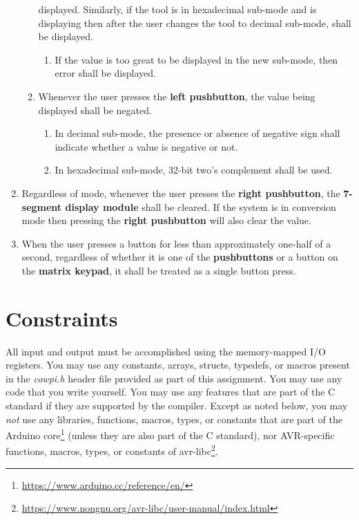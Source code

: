 \begin{enumerate}
\begin{enumerate}
        displayed. Similarly, if the tool is in hexadecimal sub-mode and is
        displaying {} then after the user changes the tool to
        decimal sub-mode, {} shall be displayed.
        \begin{enumerate}
        \item If the value is too great to be displayed in the new sub-mode,
            then {\dviiseg error} shall be displayed.
        \end{enumerate}
    \item Whenever the user presses the \textbf{left pushbutton}, the value
        being displayed shall be negated.
        \begin{enumerate}
        \item In decimal sub-mode, the presence or absence of negative sign
            shall indicate whether a value is negative or not.
        \item In hexadecimal sub-mode, 32-bit two's complement shall be used.
        \end{enumerate}
    \end{enumerate}
    \item Regardless of mode, whenever the user presses the \textbf{right
        pushbutton}, the \textbf{7-segment display module} shall be cleared. If
        the system is in conversion mode then pressing the \textbf{right
        pushbutton} will also clear the value.
    \item When the user presses a button for less than approximately one-half of a second, regardless of whether it is one of the \textbf{pushbuttons} or a button on the \textbf{matrix keypad}, it shall be treated as a single button press.
\end{enumerate}

\section{Constraints}\label{sec:Constraints}

All input and output must be accomplished using the memory-mapped I/O
registers. You may use any constants, arrays, structs, typedefs, or macros
present in the \textit{cowpi.h} header file provided as part of this
assignment. You may use any code that you write yourself. You may use any
features that are part of the C standard if they are supported by the
compiler. Except as noted below, you may \textit{not} use any libraries,
functions, macros, types, or constants that are part of the Arduino
core\footnote{\url{https://www.arduino.cc/reference/en/}} (unless they are
also part of the C standard), nor AVR-specific functions, macros, types, or
constants of avr-libc\footnote{\url{https://www.nongnu.org/avr-libc/user-manual/index.html}}.


